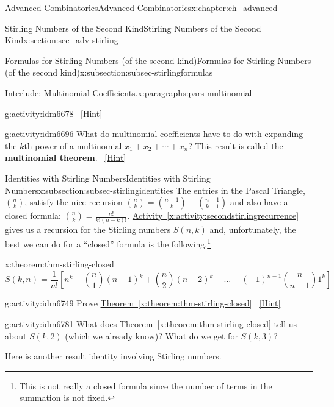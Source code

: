 \documentclass[oneside,10pt,]{book}
\newcommand{\terminology}[1]{\textbf{#1}}
\numberwithin{equation}{chapter}
\begin{document}
\begin{chapterptx}{Advanced Combinatorics}{}{Advanced Combinatorics}{}{}{x:chapter:ch_advanced}
\begin{sectionptx}{Stirling Numbers of the Second Kind}{}{Stirling Numbers of the Second Kind}{}{}{x:section:sec_adv-stirling}
\begin{subsectionptx}{Formulas for Stirling Numbers (of the second kind)}{}{Formulas for Stirling Numbers (of the second kind)}{}{}{x:subsection:subsec-stirlingformulas}
\begin{paragraphs}{Interlude: Multinomial Coefficients.}{x:paragraphs:pars-multinomial}
\begin{activity}{}{g:activity:idm6678}
\qquad~\hfill{\tiny\hyperlink{g:hint:idm6685-back}{[Hint]}}\end{activity}
\begin{activity}{}{g:activity:idm6696}%
What do multinomial coefficients have to do with expanding the \(k\)th power of a multinomial \(x_1+x_2+\cdots+x_n\)? This result is called the \terminology{multinomial theorem}.%
\qquad~\hfill{\tiny\hyperlink{g:hint:idm6702-back}{[Hint]}}\end{activity}
\end{paragraphs}%
\end{subsectionptx}
%
%
\typeout{************************************************}
\typeout{************************************************}
%
\begin{subsectionptx}{Identities with Stirling Numbers}{}{Identities with Stirling Numbers}{}{}{x:subsection:subsec-stirlingidentities}
The entries in the Pascal Triangle, \(\binom{n}{k}\), satisfy the nice recursion \(\binom{n}{k} = \binom{n - 1}{k} + \binom{n - 1}{k - 1}\) and also have a closed formula: \(\binom{n}{k} = \frac{n!}{k!(n - k)!}\). \hyperref[x:activity:secondstirlingrecurrence]{Activity~\ref{x:activity:secondstirlingrecurrence}} gives us a recursion for the Stirling numbers \(S(n,k)\) and, unfortunately, the best we can do for a ``closed'' formula is the following.\footnote{This is not really a closed formula since the number of terms in the summation is not fixed.\label{g:fn:idm6744}}%
\begin{theorem}{}{}{x:theorem:thm-stirling-closed}%
%
\begin{equation*}
S(k,n) = \frac{1}{n!}\left[n^{k} - \binom{n}{1} \left( n - 1 \right)^{k} + \binom{n}{2} \left( n - 2 \right)^{k} - \ldots + \left( - 1 \right)^{n - 1}\binom{n}{n - 1} 1^{k} \right] 
\end{equation*}
%
\end{theorem}
\begin{activity}{}{g:activity:idm6749}%
Prove \hyperref[x:theorem:thm-stirling-closed]{Theorem~\ref{x:theorem:thm-stirling-closed}}%
\qquad~\hfill{\tiny\hyperlink{g:hint:idm6753-back}{[Hint]}}\end{activity}
\begin{activity}{}{g:activity:idm6781}%
What does \hyperref[x:theorem:thm-stirling-closed]{Theorem~\ref{x:theorem:thm-stirling-closed}} tell us about \(S(k, 2)\) (which we already know)?  What do we get for \(S(k,3)\)?%
\end{activity}
Here is another result identity involving Stirling numbers.%

\end{subsectionptx}
\end{sectionptx}
\end{chapterptx}
\end{document}
